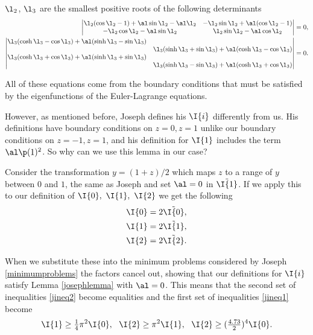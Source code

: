 $ \l_2$, $ \l_3$ are the smallest positive roots of the following determinants
\begin{align}
    \begin{vmatrix}
        \l_2 (\cos \l_2 - 1) + \al \sin \l_2 - \al \l_2 & - \l_2 \sin \l_2 + \al (\cos \l_2 - 1) \\
        -\l_2 \cos \l_2 - \al \sin \l_2 & \l_2 \sin \l_2 - \al \cos \l_2
    \end{vmatrix} &= 0, \\
    \begin{vmatrix}
        \l_3 ( \cosh \l_3 - \cos \l_3 ) + \al ( \sinh \l_3 - \sin \l_3) & \\
         & \l_3 ( \sinh \l_3 + \sin \l_3 ) + \al ( \cosh \l_3 - \cos \l_3) \\
        \l_3 ( \cosh \l_3 + \cos \l_3 ) + \al ( \sinh \l_3 + \sin \l_3) & \\ & \l_3 ( \sinh \l_3 - \sin \l_3 ) + \al ( \cosh \l_3 + \cos \l_3)
    \end{vmatrix} &= 0.
\end{align}

All of these equations come from the boundary conditions that must be satisfied by the eigenfunctions of the Euler-Lagrange equations. 

However, as mentioned before, Joseph defines his $ \I{i} $ differently from us. His definitions have boundary conditions on $ z = 0, z = 1$ unlike our boundary conditions on $ z = -1, z = 1$, and his definition for $ \I{1}$ includes the term $ \al \p(1)^2$. So why can we use this lemma in our case? 

Consider the transformation $ y = (1 + z) / 2$ which maps $ z $ to a range of $ y $ between $ 0 $ and $ 1$, the same as Joseph and set $ \al = 0 $ in $ \Tilde{\I{1}}$. If we apply this to our definition of $ \I{0},\ \I{1},\ \I{2} $ we get the following
\begin{align}
    \I{0} &= 2 \Tilde{\I{0}}, \\
    \I{1} &= 2 \Tilde{\I{1}}, \\
    \I{2} &= 2 \Tilde{\I{2}}.
\end{align}

When we substitute these into the minimum problems considered by Joseph \eqref{minimumproblems} the factors cancel out, showing that our definitions for $ \I{i}$ satisfy Lemma \ref{josephlemma} with $ \al = 0$. This means that the second set of inequalities \eqref{jineq2} become equalities and the first set of inequalities \eqref{jineq1} become
\begin{equation}
    \I{1} \geq \tfrac{1}{4} \pi^2 \I{0} ,\ \ \I{2} \geq \pi^2 \I{1},\ \ \I{2} \geq (\tfrac{4.73}{2})^4 \I{0}.
\end{equation}

